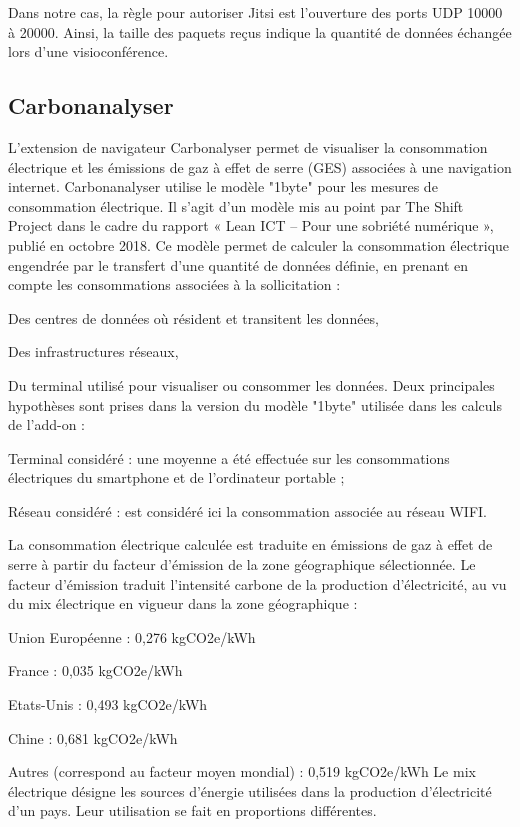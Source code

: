 \documentclass[11pt,a4paper]{report}
\begin{document}
Dans notre cas, la règle pour autoriser Jitsi est l'ouverture des ports UDP 10000 à 20000. Ainsi, la taille des paquets reçus indique la quantité de données échangée lors d'une visioconférence.

\subsection{Carbonanalyser}
L’extension de navigateur Carbonalyser permet de visualiser la consommation électrique et les émissions de gaz à effet de serre (GES) associées à une navigation internet.
Carbonanalyser utilise le modèle "1byte" pour les mesures de consommation électrique. Il s'agit d'un modèle mis au point par The Shift Project dans le cadre du rapport « Lean ICT – Pour une sobriété numérique », publié en octobre 2018. Ce modèle permet de calculer la consommation électrique engendrée par le transfert d’une quantité de données définie, en prenant en compte les consommations associées à la sollicitation :
\bi \item Des centres de données où résident et transitent les données,
\item Des infrastructures réseaux,
\item Du terminal utilisé pour visualiser ou consommer les données. \ei
Deux principales hypothèses sont prises dans la version du modèle "1byte" utilisée dans les calculs de l’add-on :
\bi \item Terminal considéré : une moyenne a été effectuée sur les consommations électriques du smartphone et de l’ordinateur portable ;
\item Réseau considéré : est considéré ici la consommation associée au réseau WIFI.  \ei

La consommation électrique calculée est traduite en émissions de gaz à effet de serre à partir du facteur d’émission de la zone géographique sélectionnée. Le facteur d’émission traduit l’intensité carbone de la production d’électricité, au vu du mix électrique en vigueur dans la zone géographique :
\bi \item Union Européenne : 0,276 kgCO2e/kWh
\item France : 0,035 kgCO2e/kWh
\item Etats-Unis : 0,493 kgCO2e/kWh
\item Chine : 0,681 kgCO2e/kWh
\item Autres (correspond au facteur moyen mondial) : 0,519 kgCO2e/kWh \ei
{} Le mix électrique désigne les sources d’énergie utilisées dans la production d’électricité d’un pays. Leur utilisation se fait en proportions différentes. \eb
\end{document}
